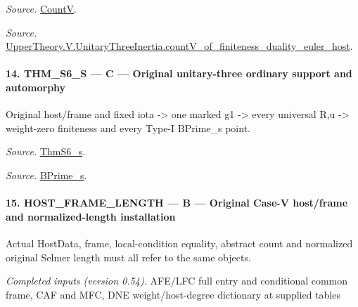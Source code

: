 \emph{Source.} \href{https://github.com/CocoSgt/riemann-hypothesis-lean/blob/7cbf7a0c32fca1badf05931879a37c3f8a2b03b4/src/Development/AutomorphicArithmetic/AutomorphicVarieties/HeightAndVanishing/Counts.lean#L69-L69}{CountV}.

\emph{Source.} \href{https://github.com/CocoSgt/riemann-hypothesis-lean/blob/7cbf7a0c32fca1badf05931879a37c3f8a2b03b4/src/Development/AutomorphicArithmetic/AutomorphicVarieties/ModularityArgument/ThresholdArguments/DenseThresholdCases/CountVOf.lean#L33-L60}{UpperTheory.V.UnitaryThreeInertia.countV\_\allowbreak of\_\allowbreak finiteness\_\allowbreak duality\_\allowbreak euler\_\allowbreak host}.



\paragraph{14. THM\_\allowbreak S6\_\allowbreak S — C — Original unitary-three ordinary support and automorphy}

Original host/frame and fixed iota -> one marked g1 -> every universal R,u -> weight-zero finiteness and every Type-I BPrime\_\allowbreak s point.

\emph{Source.} \href{https://github.com/CocoSgt/riemann-hypothesis-lean/blob/7cbf7a0c32fca1badf05931879a37c3f8a2b03b4/src/Development/AutomorphicArithmetic/AutomorphicVarieties/ModularityArgument/ThresholdArguments/DenseThresholdCases/ThmS6CoreS.lean#L17-L26}{ThmS6\_\allowbreak s}.

\emph{Source.} \href{https://github.com/CocoSgt/riemann-hypothesis-lean/blob/7cbf7a0c32fca1badf05931879a37c3f8a2b03b4/src/Development/AutomorphicArithmetic/AutomorphicVarieties/ModularityArgument/ThresholdArguments/DenseThresholdCases/ThmS6CoreS.lean#L12-L16}{BPrime\_\allowbreak s}.



\paragraph{15. HOST\_\allowbreak FRAME\_\allowbreak LENGTH — B — Original Case-V host/frame and normalized-length installation}

Actual HostData, frame, local-condition equality, abstract count and normalized original Selmer length must all refer to the same objects.

\emph{Completed inputs (version 0.54).} AFE/LFC full entry and conditional common frame, CAF and MFC, DNE weight/host-degree dictionary at supplied tables

